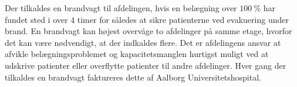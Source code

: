 
Der tilkaldes en brandvagt til afdelingen, hvis en belægning over $100~\%$ har fundet sted i over $4$ timer for således at sikre patienterne ved evakuering under brand. En brandvagt kan højest overvåge to afdelinger på samme etage, hvorfor det kan være nødvendigt, at der indkaldes flere. Det er afdelingens ansvar at afvikle belægningsproblemet og kapacitetsmanglen hurtigst muligt ved at udskrive patienter eller overflytte patienter til andre afdelinger. Hver gang der tilkaldes en brandvagt faktureres dette af Aalborg Universitetshospital.\cite{Beredskab2016}


